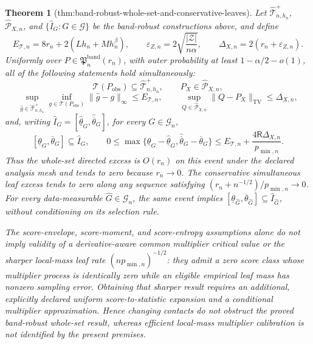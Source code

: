 \documentclass{article}
\newtheorem{theorem}{Theorem}
\begin{document}
\begin{theorem}[thm:band-robust-whole-set-and-conservative-leaves]\label{thm:band-robust-whole-set-and-conservative-leaves}
Let \(\widehat{\mathcal T}_{n,h_n}^{+}\), \(\widehat{\mathcal P}_{X,n}\), and \(\{\widehat I_G:G\in\mathcal G\}\) be the band-robust constructions above, and define
\[
E_{\mathcal T,n}=8r_n+2(Lh_n+Mh_n^\beta),
\qquad
\varepsilon_{Z,n}=2\sqrt{\frac{|\mathcal Z|}{n\alpha}},
\qquad
\Delta_{X,n}=2(r_n+\varepsilon_{Z,n}).
\]
Uniformly over \(P\in\mathfrak P_n^{\mathrm{band}}(r_n)\), with outer probability at least \(1-\alpha/2-o(1)\), all of the following statements hold simultaneously:
\[
\mathcal T(P_{\mathrm{obs}})\subseteq\widehat{\mathcal T}_{n,h_n}^{+},
\qquad
P_X\in\widehat{\mathcal P}_{X,n},
\]
\[
\sup_{\widehat g\in\widehat{\mathcal T}_{n,h_n}^{+}}
\inf_{g\in\mathcal T(P_{\mathrm{obs}})}\|\widehat g-g\|_\infty
\leq E_{\mathcal T,n},
\qquad
\sup_{Q\in\widehat{\mathcal P}_{X,n}}\|Q-P_X\|_{\mathrm{TV}}
\leq\Delta_{X,n},
\]
and, writing \(\widehat I_G=[\widehat{\underline\theta}_G,\widehat{\overline\theta}_G]\), for every \(G\in\mathcal G_n\),
\[
[\underline\theta_G,\overline\theta_G]\subseteq\widehat I_G,
\qquad
0\leq
\max\{\underline\theta_G-\widehat{\underline\theta}_G,
\widehat{\overline\theta}_G-\overline\theta_G\}
\leq E_{\mathcal T,n}+\frac{4\mathsf R\Delta_{X,n}}{p_{\min,n}}.
\]
Thus the whole-set directed excess is \(O(r_n)\) on this event under the declared analysis mesh and tends to zero because \(r_n\to0\).  The conservative simultaneous leaf excess tends to zero along any sequence satisfying \((r_n+n^{-1/2})/p_{\min,n}\to0\).  For every data-measurable \(\widehat G\in\mathcal G_n\), the same event implies \([\underline\theta_{\widehat G},\overline\theta_{\widehat G}]\subseteq\widehat I_{\widehat G}\), without conditioning on its selection rule.

The score-envelope, score-moment, and score-entropy assumptions alone do not imply validity of a derivative-aware common multiplier critical value or the sharper local-mass leaf rate \((np_{\min,n})^{-1/2}\): they admit a zero score class whose multiplier process is identically zero while an eligible empirical leaf mass has nonzero sampling error.  Obtaining that sharper result requires an additional, explicitly declared uniform score-to-statistic expansion and a conditional multiplier approximation.  Hence changing contacts do not obstruct the proved band-robust whole-set result, whereas efficient local-mass multiplier calibration is not identified by the present premises.
\end{theorem}
\end{document}
